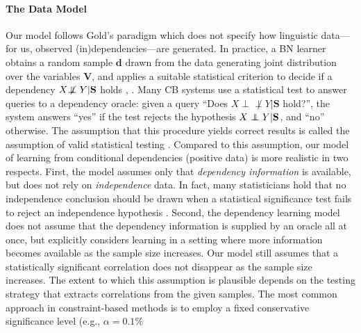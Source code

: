 \documentclass{elsarticle}%
\renewcommand{\d}{\mathbf{d}}
\newcommand{\indep}{\ensuremath{\perp{}\!\!\!\!\!\!\!\perp{}}}
\newcommand{\dep}{\ensuremath{{\perp{}\!\!\!\!\!\!\!\not  \perp{}}}}
\begin{document}
\paragraph{The Data Model} Our model follows Gold's paradigm which does not specify how linguistic data---for us, observed (in)dependencies---are generated. In practice, a BN learner obtains a random sample $\d$
drawn from the data generating joint distribution over the variables $\mathbf{V}$,
and applies a suitable statistical criterion to decide if a dependency $X \protect\dep Y | \mathbf{S}$ holds \cite{peter00:_causat}, \cite[Sec.4]{bib:max-min}.
Many CB systems use a statistical test to answer queries to a dependency oracle: given a query ``Does $X \dep Y | \mathbf{S}$ hold?'',
 the system answers ``yes'' if the test rejects the hypothesis $X \protect\indep Y | \mathbf{S}$, and 
``no'' otherwise. The assumption that this procedure yields correct results is called the assumption of valid statistical testing
\cite[Sect.6.2]{cooper99:_comput_causat_discov}.
Compared to this assumption, our model of learning from conditional dependencies (positive data) is  more realistic in two respects. First, the model assumes
only that \emph{dependency information} is available,
but does not rely on
{\em independence} data.
In fact, many statisticians hold that no independence conclusion
should be drawn when a statistical significance test fails to reject an independence hypothesis \cite{giere72:_signif_test_contr}.
Second, the dependency learning model does not assume that the dependency information is supplied by an oracle all at once, but explicitly considers learning in a setting where more information becomes available as
the sample size increases. Our model still assumes that a statistically significant correlation does not disappear as the sample size increases.  The extent to  which this assumption is plausible depends on the testing strategy that extracts correlations from the given samples. The most common approach in constraint-based methods is to employ a fixed conservative significance level (e.g., $\alpha = 0.1\%$ %
\end{document}
